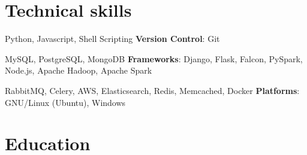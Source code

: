 \documentclass[11pt,a4paper]{moderncv}
\begin{document}
\maketitle

\section{Technical skills}
           {Python, Javascript, Shell Scripting}
           {\textbf{Version Control}: }
           {Git}

           {MySQL, PostgreSQL, MongoDB}
           {\textbf{Frameworks}: }
           {Django, Flask, Falcon, PySpark, Node.js, Apache Hadoop, Apache Spark}

           {RabbitMQ, Celery, AWS, Elasticsearch, Redis, Memcached, Docker}
           {\textbf{Platforms}: }
           {GNU/Linux (Ubuntu), Windows}

\section{Education}
\end{document}
